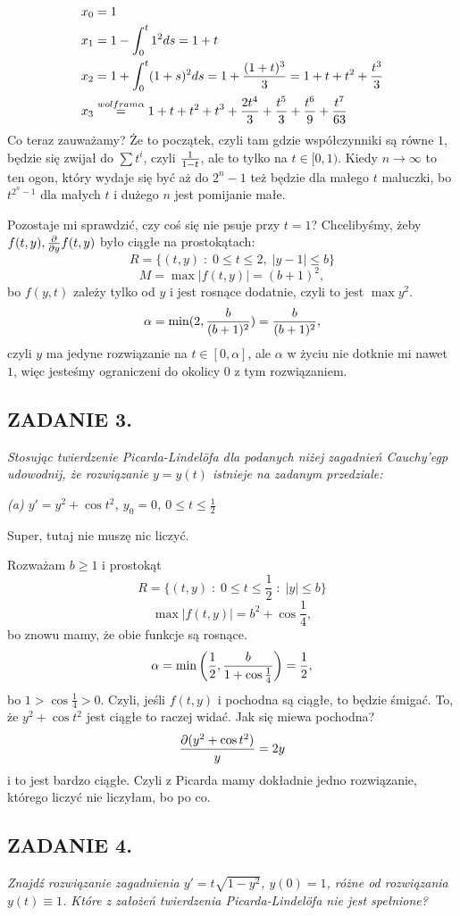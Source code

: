 \documentclass{article}
\begin{document}
\begin{align*}
    x_0&=1\\
    x_1&=1-\int_0^t1^2ds=1+t\\
    x_2&=1+\int_0^t(1+s)^2ds=1+{(1+t)^3\over 3}=1+t+t^2+{t^3\over 3}\\
    x_3&\overset{wolfram\alpha}{=}1+t+t^2+t^3+{2t^4\over 3}+{t^5\over3}+{t^6\over 9}+{t^7\over 63}
\end{align*}
Co teraz zauważamy? Że to początek, czyli tam gdzie współczynniki są równe $1$, będzie się zwijał do $\sum t^i$, czyli ${1\over 1-t}$, ale to tylko na $t\in[0, 1)$. Kiedy $n\to\infty$ to ten ogon, który wydaje się być aż do $2^n-1$ też będzie dla małego $t$ maluczki, bo $t^{2^n-1}$ dla małych $t$ i dużego $n$ jest pomijanie małe.

Pozostaje mi sprawdzić, czy coś się nie psuje przy $t=1$? Chcelibyśmy, żeby $f(t, y),{\partial\over\partial y}f(t, y)$ było ciągłe na prostokątach:
$$R=\{(t, y)\;:\;0\leq t\leq 2,\;|y-1|\leq b\}$$
$$M=\max|f(t, y)|=(b+1)^2,$$
bo $f(y, t)$ zależy tylko od $y$ i jest rosnące dodatnie, czyli to jest $\max y^2$.
$$\alpha=\min(2, {b\over (b+1)^2})={b\over (b+1)^2},$$ 
czyli $y$ ma jedyne rozwiązanie na $t\in[0,\alpha]$, ale $\alpha$ w życiu nie dotknie mi nawet $1$, więc jesteśmy ograniczeni do okolicy $0$ z tym rozwiązaniem.

\subsection*{ZADANIE 3.}
\emph{\color{pink}Stosując twierdzenie Picarda-Lindel\"ofa dla podanych niżej zagadnień Cauchy'egp udowodnij, że rozwiązanie $y=y(t)$ istnieje na zadanym przedziale:}

\emph{\color{pink}(a) $y'=y^2+\cos t^2$, $y_0=0$, $0\leq t\leq\frac12$}

Super, tutaj nie muszę nic liczyć.

Rozważam $b\geq 1$ i prostokąt
$$R=\{(t, y)\;:\;0\leq t\leq\frac12\;:\;|y|\leq b\}$$
$$\max|f(t, y)|=b^2+\cos\frac14,$$
bo znowu mamy, że obie funkcje są rosnące.
$$\alpha=\min\left(\frac12,{b\over1+\cos\frac14}\right)=\frac12,$$
bo $1>\cos \frac14>0$. Czyli, jeśli $f(t, y)$ i pochodna są ciągłe, to będzie śmigać. To, że $y^2+\cos t^2$ jest ciągłe to raczej widać. Jak się miewa pochodna?
$${\partial(y^2+\cos t^2)\over y}=2y$$
i to jest bardzo ciągłe. Czyli z Picarda mamy dokładnie jedno rozwiązanie, którego liczyć nie liczyłam, bo po co.

\subsection*{ZADANIE 4.}
\emph{\color{pink}Znajdź rozwiązanie zagadnienia $y'=t\sqrt{1-y^2}$, $y(0)=1$, różne od rozwiązania $y(t)\equiv1$. Które z założeń twierdzenia Picarda-Lindel\"ofa nie jest spełnione?}
\end{document}
